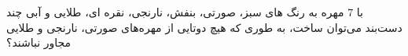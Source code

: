 با 
$7$
 مهره به رنگ ها‌ی سبز، صورتی، بنفش، نارنجی، نقره ای، طلایی و آبی چند دست‌بند می‌توان ساخت، به طوری که هیچ دوتایی از مهره‌های صورتی، نارنجی و طلایی مجاور نباشند؟